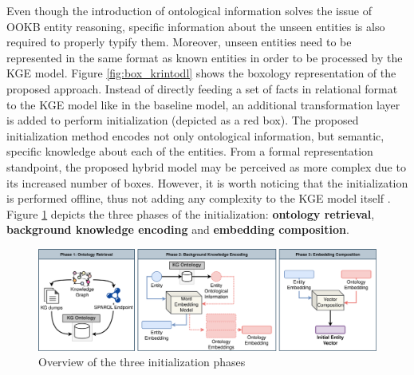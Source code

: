 Even though the introduction of ontological information solves the issue of OOKB entity reasoning, specific information about the unseen entities is also required to properly typify them. Moreover, unseen entities need to be represented in the same format as known entities in order to be processed by the KGE model. Figure \ref{fig:box_krintodl} shows the boxology representation of the proposed approach. Instead of directly feeding a set of facts in relational format to the KGE model like in the baseline model, an additional transformation layer is added to perform initialization (depicted as a red box). The proposed initialization method encodes not only ontological information, but semantic, specific knowledge about each of the entities. From a formal representation standpoint, the proposed hybrid model may be perceived as more complex due to its increased number of boxes. However, it is worth noticing that the initialization is performed offline, thus not adding any complexity to the KGE model itself . Figure \ref{fig:overview} depicts the three phases of the initialization: \textbf{ontology retrieval}, \textbf{background knowledge encoding} and \textbf{embedding composition}.

 

\begin{figure}
    \centering
    \includegraphics[width=\linewidth]{4_kbsintegrationdl/figures/Initialization_phases.eps}
    \caption{Overview of the three initialization phases}
    \label{fig:overview}
\end{figure}


